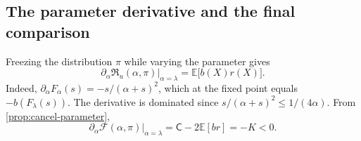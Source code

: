 \documentclass[11pt,a4paper]{article}
\numberwithin{equation}{section}
\theoremstyle{notethm}
\theoremstyle{definition}
\newcommand{\E}{\mathbb E}
\newcommand{\cF}{\mathscr F}
\newcommand{\res}{\mathfrak R}
\begin{document}
\subsection{The parameter derivative and the final comparison}

Freezing the distribution $\pi$ while varying the parameter gives
\begin{equation}\label{eq:parameter-residual}
 \left.\partial_\alpha\res_u(\alpha,\pi)\right|_{\alpha=\lambda}
 =\E\bigl[b(X)r(X)\bigr].
\end{equation}
Indeed, $\partial_\alpha F_\alpha(s)=-s/(\alpha+s)^2$, which at the fixed
point equals $-b(F_\lambda(s))$. The derivative is dominated since
$s/(\alpha+s)^2\le1/(4\alpha)$. From \cref{prop:cancel-parameter},
\begin{equation}\label{eq:parameter-negative}
 \left.\partial_\alpha\cF(\alpha,\pi)\right|_{\alpha=\lambda}
 =\mathsf C-2\E[br]=-K<0.
\end{equation}
\end{document}
